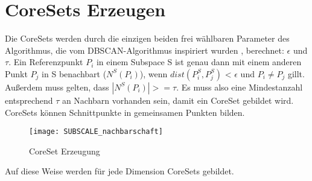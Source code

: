 \section{CoreSets Erzeugen}

Die CoreSets werden durch die einzigen beiden frei wählbaren Parameter des Algorithmus, die vom
DBSCAN-Algorithmus inspiriert wurden \cite{7022654}, berechnet: $\epsilon$ und $\tau$. Ein
Referenzpunkt $P_{i}$ in
einem Subspace S ist genau dann mit einem anderen Punkt $P_{j}$ in S benachbart ($N^{S}(P_{i})$),
wenn $dist(P_{i}^{S}, P_{j}^{S})$ < $\epsilon$ und $P_{i} \neq P_{j}$ gillt. Außerdem muss gelten,
dass
$|N^{S}(P_{i})| >= \tau$. Es muss also eine Mindestanzahl entsprechend $\tau$ an Nachbarn vorhanden
sein, damit ein CoreSet gebildet wird.
CoreSets können Schnittpunkte in gemeinsamen Punkten bilden.

\begin{figure}[h]
    \centering
    \texttt{[image: SUBSCALE\_nachbarschaft]}
    \caption[Corset Erzeugung]{CoreSet Erzeugung}
    \label{img:CoresetsErzeugen}
\end{figure}


Auf diese Weise werden für jede Dimension CoreSets gebildet.